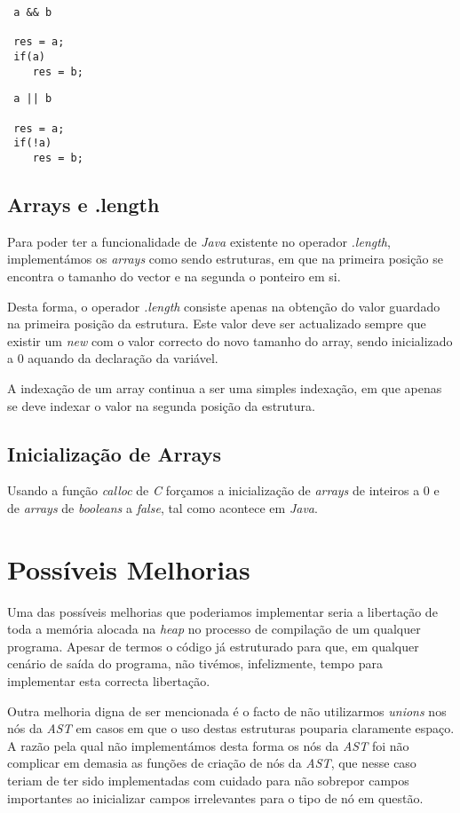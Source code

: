 \documentclass[11pt,a4paper]{article}
\begin{document}
\begin{lstlisting}
 a && b
 
 res = a;
 if(a)
    res = b;
\end{lstlisting}

\begin{lstlisting}
 a || b
 
 res = a;
 if(!a)
    res = b;
\end{lstlisting}

\subsection{Arrays e .length}

Para poder ter a funcionalidade de \textit{Java} existente no operador \textit{.length}, implementámos os \textit{arrays} como sendo estruturas, em que na primeira posição se encontra o tamanho do vector e na segunda o ponteiro em si.

Desta forma, o operador \textit{.length} consiste apenas na obtenção do valor guardado na primeira posição da estrutura. Este valor deve ser actualizado sempre que existir um \textit{new} com o valor correcto do novo tamanho do array, sendo inicializado a 0 aquando da declaração da variável.

A indexação de um array continua a ser uma simples indexação, em que apenas se deve indexar o valor na segunda posição da estrutura.

\subsection{Inicialização de Arrays}

Usando a função \textit{calloc} de \textit{C} forçamos a inicialização de \textit{arrays} de inteiros a 0 e de \textit{arrays} de \textit{booleans} a \textit{false}, tal como acontece em \textit{Java}.

\section{Possíveis Melhorias}

Uma das possíveis melhorias que poderiamos implementar seria a libertação de toda a memória alocada na \textit{heap} no processo de compilação de um qualquer programa. Apesar de termos o código já estruturado para que, em qualquer cenário de saída do programa, não tivémos, infelizmente, tempo para implementar esta correcta libertação.

Outra melhoria digna de ser mencionada é o facto de não utilizarmos \textit{unions} nos nós da \textit{AST} em casos em que o uso destas estruturas pouparia claramente espaço. A razão pela qual não implementámos desta forma os nós da \textit{AST} foi não complicar em demasia as funções de criação de nós da \textit{AST}, que nesse caso teriam de ter sido implementadas com cuidado para não sobrepor campos importantes ao inicializar campos irrelevantes para o tipo de nó em questão.
\end{document}
